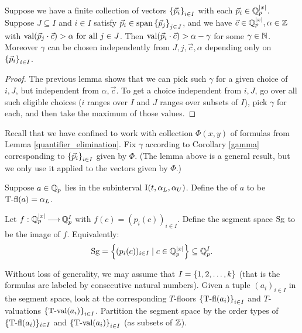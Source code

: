 \begin{Corollary}	 \label{gamma}
  Suppose we have a finite collection of vectors $\left\{\vec p_i\right\}_{i \in I}$ with each $\vec p_i \in \mathbb{Q}_p^{|x|}$.
  Suppose $J \subseteq I$ and $i \in I$ satisfy $\vec p_i \in \operatorname{span} \left\{\vec p_j\right\}_{j \in J}$,
  and we have $\vec c \in \mathbb{Q}_p^{|x|}, \alpha \in \mathbb{Z}$ with $\operatorname{val}(\vec p_j \cdot \vec c) > \alpha \text{ for all } j \in J$.
  Then $\operatorname{val}(\vec p_i \cdot \vec c) > \alpha - \gamma$
  for some $\gamma \in \mathbb{N}$.
  Moreover $\gamma$ can be chosen independently from $J, j, \vec c, \alpha$ depending only on $\left\{\vec p_i\right\}_{i \in I}$.
\end{Corollary}
\begin{proof}
  The previous lemma shows that we can pick such $\gamma$ for a given choice of $i, J$, but independent from $\alpha, \vec c$.
  To get a choice independent from $i, J$, go over all such eligible choices 
  ($i$ ranges over $I$ and $J$ ranges over subsets of $I$),
  pick $\gamma$ for each, and then take the maximum of those values.  
\end{proof}

Recall that we have confined to work with collection $\Phi(x, y)$ of formulas from Lemma \ref{quantifier_elimination}.
Fix $\gamma$ according to Corollary \ref{gamma} corresponding to $\left\{\vec p_i\right\}_{i \in I}$ given by $\Phi$.
(The lemma above is a general result, but we only use it applied to the vectors given by $\Phi$.)

\begin{Definition}
  Suppose $a \in \mathbb{Q}_p$ lies in the subinterval $\operatorname{I}(t, \alpha_L, \alpha_U)$.
  Define the  of $a$ to be $\operatorname{T-fl}(a) = \alpha_L$.
\end{Definition}

\begin{Definition}
  Let $f: \mathbb{Q}_p^{|x|} \operatorname{\longrightarrow} \mathbb{Q}_p^I$ with $f(c) = (p_i(c))_{i \in I}$.
  Define the segment space $\operatorname{Sg}$ to be the image of $f$.
  Equivalently:
  \begin{align*}
    \operatorname{Sg} = \left\{(p_i(c))_{i \in I} \mid c \in \mathbb{Q}_p^{|x|}\right\} \subseteq \mathbb{Q}_p^I.
  \end{align*}
\end{Definition}

Without loss of generality, we may assume that $I = \left\{1,2, \ldots, k\right\}$ (that is the formulas are labeled by consecutive natural numbers).
Given a tuple $(a_i)_{i\in I}$ in the segment space,
look at the corresponding $T$-floors $\left\{\operatorname{T-fl}(a_i)\right\}_{i\in I}$ and $T$-valuations $\left\{\operatorname{T-val}(a_i)\right\}_{i\in I}$.
Partition the segment space by the order types of $\{\operatorname{T-fl}(a_i)\}_{i\in I}$ and $\left\{\operatorname{T-val}(a_i)\right\}_{i\in I}$ (as subsets of $\mathbb{Z}$).

